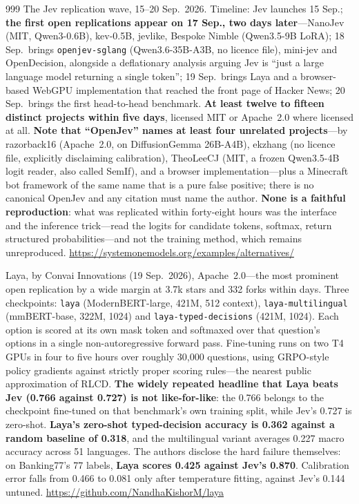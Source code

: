 \begin{thebibliography}{999}
 The Jev replication wave, 15--20 Sep.\ 2026. Timeline: Jev launches 15 Sep.; \textbf{the first open replications appear on 17 Sep., two days later}---NanoJev (MIT, Qwen3-0.6B), kev-0.5B, jevlike, Bespoke Nimble (Qwen3.5-9B LoRA); 18 Sep.\ brings \texttt{openjev-sglang} (Qwen3.6-35B-A3B, no licence file), mini-jev and OpenDecision, alongside a deflationary analysis arguing Jev is ``just a large language model returning a single token''; 19 Sep.\ brings Laya and a browser-based WebGPU implementation that reached the front page of Hacker News; 20 Sep.\ brings the first head-to-head benchmark. \textbf{At least twelve to fifteen distinct projects within five days}, licensed MIT or Apache~2.0 where licensed at all. \textbf{Note that ``OpenJev'' names at least four unrelated projects}---by razorback16 (Apache~2.0, on DiffusionGemma 26B-A4B), ekzhang (no licence file, explicitly disclaiming calibration), TheoLeeCJ (MIT, a frozen Qwen3.5-4B logit reader, also called SemIf), and a browser implementation---plus a Minecraft bot framework of the same name that is a pure false positive; there is no canonical OpenJev and any citation must name the author. \textbf{None is a faithful reproduction}: what was replicated within forty-eight hours was the interface and the inference trick---read the logits for candidate tokens, softmax, return structured probabilities---and not the training method, which remains unreproduced. \url{https://systemonemodels.org/examples/alternatives/}

 Laya, by Convai Innovations (19 Sep.\ 2026), Apache~2.0---the most prominent open replication by a wide margin at 3.7k stars and 332 forks within days. Three checkpoints: \texttt{laya} (ModernBERT-large, 421M, 512 context), \texttt{laya-multilingual} (mmBERT-base, 322M, 1024) and \texttt{laya-typed-decisions} (421M, 1024). Each option is scored at its own mask token and softmaxed over that question's options in a single non-autoregressive forward pass. Fine-tuning runs on two T4 GPUs in four to five hours over roughly 30,000 questions, using GRPO-style policy gradients against strictly proper scoring rules---the nearest public approximation of RLCD. \textbf{The widely repeated headline that Laya beats Jev (0.766 against 0.727) is not like-for-like}: the 0.766 belongs to the checkpoint fine-tuned on that benchmark's own training split, while Jev's 0.727 is zero-shot. \textbf{Laya's zero-shot typed-decision accuracy is 0.362 against a random baseline of 0.318}, and the multilingual variant averages 0.227 macro accuracy across 51 languages. The authors disclose the hard failure themselves: on Banking77's 77 labels, \textbf{Laya scores 0.425 against Jev's 0.870}. Calibration error falls from 0.466 to 0.081 only after temperature fitting, against Jev's 0.144 untuned. \url{https://github.com/NandhaKishorM/laya}


\end{thebibliography}
